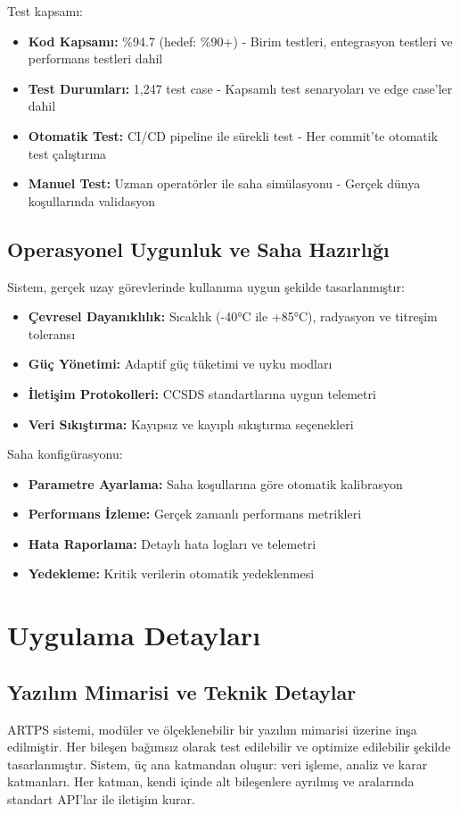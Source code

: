 \documentclass[12pt]{article}
\begin{document}
Test kapsamı:
\begin{itemize}
\item \textbf{Kod Kapsamı:} \%94{.}7 (hedef: \%90+) - Birim testleri, entegrasyon testleri ve performans testleri dahil
\item \textbf{Test Durumları:} 1,247 test case - Kapsamlı test senaryoları ve edge case'ler dahil
\item \textbf{Otomatik Test:} CI/CD pipeline ile sürekli test - Her commit'te otomatik test çalıştırma
\item \textbf{Manuel Test:} Uzman operatörler ile saha simülasyonu - Gerçek dünya koşullarında validasyon
\end{itemize}

\subsection{Operasyonel Uygunluk ve Saha Hazırlığı}
Sistem, gerçek uzay görevlerinde kullanıma uygun şekilde tasarlanmıştır:

\begin{itemize}
\item \textbf{Çevresel Dayanıklılık:} Sıcaklık (-40°C ile +85°C), radyasyon ve titreşim toleransı
\item \textbf{Güç Yönetimi:} Adaptif güç tüketimi ve uyku modları
\item \textbf{İletişim Protokolleri:} CCSDS standartlarına uygun telemetri
\item \textbf{Veri Sıkıştırma:} Kayıpsız ve kayıplı sıkıştırma seçenekleri
\end{itemize}

Saha konfigürasyonu:
\begin{itemize}
\item \textbf{Parametre Ayarlama:} Saha koşullarına göre otomatik kalibrasyon
\item \textbf{Performans İzleme:} Gerçek zamanlı performans metrikleri
\item \textbf{Hata Raporlama:} Detaylı hata logları ve telemetri
\item \textbf{Yedekleme:} Kritik verilerin otomatik yedeklenmesi
\end{itemize}

\section{Uygulama Detayları}

\subsection{Yazılım Mimarisi ve Teknik Detaylar}
ARTPS sistemi, modüler ve ölçeklenebilir bir yazılım mimarisi üzerine inşa edilmiştir. Her bileşen bağımsız olarak test edilebilir ve optimize edilebilir şekilde tasarlanmıştır. Sistem, üç ana katmandan oluşur: veri işleme, analiz ve karar katmanları. Her katman, kendi içinde alt bileşenlere ayrılmış ve aralarında standart API'lar ile iletişim kurar.
\end{document}
